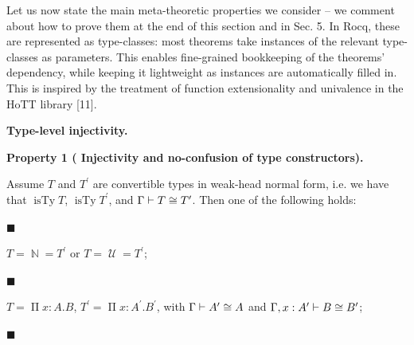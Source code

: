\documentclass[10pt,a4paper]{amsart}
\begin{document}
 
Let us now state the main meta-theoretic properties we consider – we comment about how to prove them at the end of this section and in Sec. 5. In Rocq, these are represented as type-classes: most theorems take instances of the relevant type-classes as parameters. This enables fine-grained bookkeeping of the theorems’ dependency, while keeping it lightweight as instances are automatically filled in. This is inspired by the treatment of function extensionality and univalence in the HoTT library [11].\par
 
 
 
\par\medskip\noindent\textbf{Type-level injectivity.}\par
 
 
\par\medskip\noindent\textbf{Property 1 (  Injectivity and no-confusion of type constructors).}\par
 
 
Assume $T$ and $T^{\prime}$ are convertible types in weak-head normal form, i.e. we have that $\operatorname{isTy}T$, $\operatorname{isTy}T^{\prime}$, and $\Gamma\vdash T\mathrel{\raisebox{-0.5pt}{$\cong$}}T^{\prime}$. Then one of the following holds:\par
  
\par\noindent  $\blacksquare$ 
 
$T=\operatorname{\mathbb{N}}=T^{\prime}$ or $T=\operatorname{\mathcal{U}}=T^{\prime}$;\par
 
 
 
\par\noindent  $\blacksquare$ 
 
$T=\operatorname{\Pi}x:A.B$, $T^{\prime}=\operatorname{\Pi}x:A^{\prime}.B^{\prime}$, with $\Gamma\vdash A^{\prime}\mathrel{\raisebox{-0.5pt}{$\cong$}}A$ and $\Gamma,x:A^{\prime}\vdash B\mathrel{\raisebox{-0.5pt}{$\cong$}}B^{\prime}$;\par
 
 
 
\par\noindent  $\blacksquare$ 
 
\end{document}
